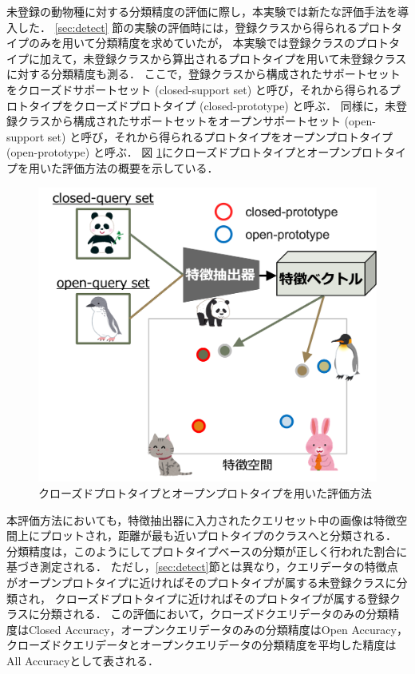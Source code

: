 未登録の動物種に対する分類精度の評価に際し，本実験では新たな評価手法を導入した．
\ref{sec:detect} 節の実験の評価時には，登録クラスから得られるプロトタイプのみを用いて分類精度を求めていたが，
本実験では登録クラスのプロトタイプに加えて，未登録クラスから算出されるプロトタイプを用いて未登録クラスに対する分類精度も測る．
ここで，登録クラスから構成されたサポートセットをクローズドサポートセット (closed-support set) と呼び，それから得られるプロトタイプをクローズドプロトタイプ (closed-prototype) と呼ぶ．
同様に，未登録クラスから構成されたサポートセットをオープンサポートセット (open-support set) と呼び，それから得られるプロトタイプをオープンプロトタイプ (open-prototype) と呼ぶ．
図 \ref{fig:openprototype}にクローズドプロトタイプとオープンプロトタイプを用いた評価方法の概要を示している．
% 
\begin{figure}[tbp]
  \centering
  \includegraphics[width=0.8\linewidth, keepaspectratio]{image/open-prototype.png}
  \caption{クローズドプロトタイプとオープンプロトタイプを用いた評価方法}
  \label{fig:openprototype}
\end{figure}
% 
本評価方法においても，特徴抽出器に入力されたクエリセット中の画像は特徴空間上にプロットされ，距離が最も近いプロトタイプのクラスへと分類される．
分類精度は，このようにしてプロトタイプベースの分類が正しく行われた割合に基づき測定される．
ただし，\ref{sec:detect}節とは異なり，クエリデータの特徴点がオープンプロトタイプに近ければそのプロトタイプが属する未登録クラスに分類され，
クローズドプロトタイプに近ければそのプロトタイプが属する登録クラスに分類される．
この評価において，クローズドクエリデータのみの分類精度はClosed Accuracy，オープンクエリデータのみの分類精度はOpen Accuracy，
クローズドクエリデータとオープンクエリデータの分類精度を平均した精度はAll Accuracyとして表される．

